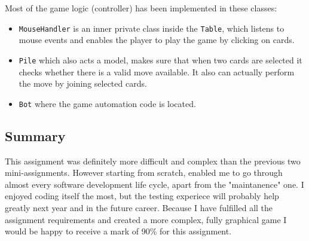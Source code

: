 \documentclass[a4paper, 12pt, titlepage]{article}
\begin{document}
Most of the game logic (controller) has been implemented in these classes:
\begin{itemize}
	\item \texttt{MouseHandler} is an inner private class inside the \texttt{Table}, 
		which listens to mouse events and enables the player to play the game by 
		clicking on cards. 
	
	\item \texttt{Pile} which also acts a model, makes sure that when two cards are 
		selected it checks whether there is a valid move available. It also can actually
		perform the move by joining selected cards.
	
	\item \texttt{Bot} where the game automation code is located. 
\end{itemize}

\subsection{Summary}
This assignment was definitely more difficult and complex than the previous two 
mini-assignments. However starting from scratch, enabled me to go through almost
every software development life cycle, apart from the "maintanence" one. I enjoyed coding
itself the most, but the testing experiece will probably help greatly next year and in
the future career. Because I have fulfilled all the assignment requirements and created 
a more complex, fully graphical game I would be happy to receive a mark of 90\% for 
this assignment.
\end{document}
